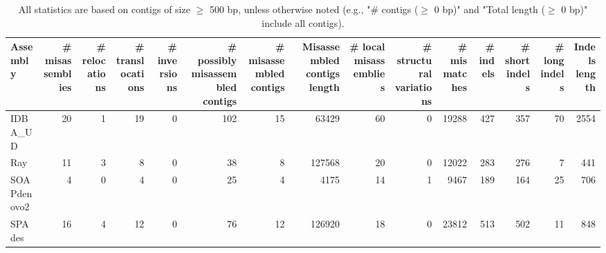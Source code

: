 \documentclass[12pt,a4paper]{article}
\begin{document}
\begin{table}[ht]
\begin{center}
\caption{All statistics are based on contigs of size $\geq$ 500 bp, unless otherwise noted (e.g., "\# contigs ($\geq$ 0 bp)" and "Total length ($\geq$ 0 bp)" include all contigs).}
\begin{tabular}{|l*{14}{|r}|}
\hline
Assembly & \# misassemblies &     \# relocations &     \# translocations &     \# inversions & \# possibly misassembled contigs & \# misassembled contigs & Misassembled contigs length & \# local misassemblies & \# structural variations & \# mismatches & \# indels &     \# short indels &     \# long indels & Indels length \\ \hline
IDBA\_UD & 20 & 1 & 19 & 0 & 102 & 15 & 63429 & 60 & 0 & 19288 & 427 & 357 & 70 & 2554 \\ \hline
Ray & 11 & 3 & 8 & 0 & 38 & 8 & 127568 & 20 & 0 & 12022 & 283 & 276 & 7 & 441 \\ \hline
SOAPdenovo2 & 4 & 0 & 4 & 0 & 25 & 4 & 4175 & 14 & 1 & 9467 & 189 & 164 & 25 & 706 \\ \hline
SPAdes & 16 & 4 & 12 & 0 & 76 & 12 & 126920 & 18 & 0 & 23812 & 513 & 502 & 11 & 848 \\ \hline
\end{tabular}
\end{center}
\end{table}
\end{document}
